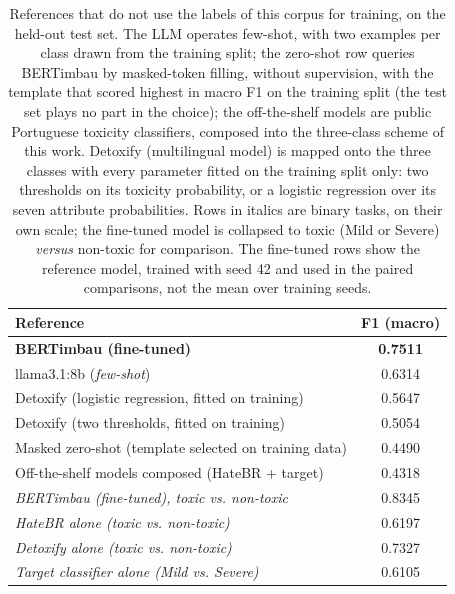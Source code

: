 \begin{table}[!t]
\centering
\caption{References that do not use the labels of this corpus for training, on the held-out test set. The LLM operates few-shot, with two examples per class drawn from the training split; the zero-shot row queries BERTimbau by masked-token filling, without supervision, with the template that scored highest in macro F1 on the training split (the test set plays no part in the choice); the off-the-shelf models are public Portuguese toxicity classifiers, composed into the three-class scheme of this work. Detoxify (multilingual model) is mapped onto the three classes with every parameter fitted on the training split only: two thresholds on its toxicity probability, or a logistic regression over its seven attribute probabilities. Rows in italics are binary tasks, on their own scale; the fine-tuned model is collapsed to toxic (Mild or Severe) \emph{versus} non-toxic for comparison. The fine-tuned rows show the reference model, trained with seed 42 and used in the paired comparisons, not the mean over training seeds.}
\label{tab:sem-finetuning}
\begin{tabular}{lc}
\toprule
Reference & F1 (macro) \\
\midrule
\textbf{BERTimbau (fine-tuned)} & \textbf{0.7511} \\
llama3.1:8b (\emph{few-shot}) & 0.6314 \\
Detoxify (logistic regression, fitted on training) & 0.5647 \\
Detoxify (two thresholds, fitted on training) & 0.5054 \\
Masked zero-shot (template selected on training data) & 0.4490 \\
Off-the-shelf models composed (HateBR + target) & 0.4318 \\
\midrule
\emph{BERTimbau (fine-tuned), toxic vs. non-toxic} & 0.8345 \\
\emph{HateBR alone (toxic vs. non-toxic)} & 0.6197 \\
\emph{Detoxify alone (toxic vs. non-toxic)} & 0.7327 \\
\emph{Target classifier alone (Mild vs. Severe)} & 0.6105 \\
\bottomrule
\end{tabular}
\end{table}
